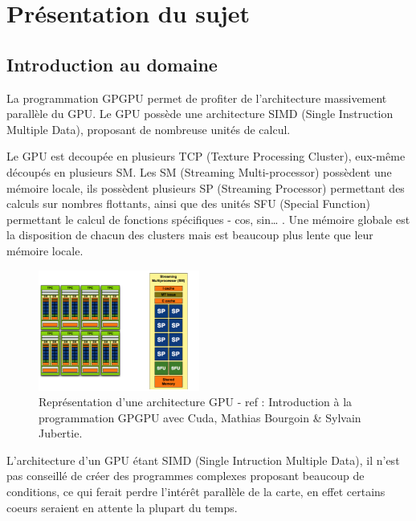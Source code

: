 \documentclass{report}
\begin{document}
\chapter{Présentation du sujet}

\section{Introduction au domaine}
La programmation GPGPU permet de profiter de l’architecture massivement parallèle du GPU. Le GPU possède une architecture SIMD (Single Instruction Multiple Data), proposant de nombreuse unités de calcul.\newline

Le GPU est decoupée en plusieurs TCP (Texture Processing Cluster), eux-même découpés en plusieurs SM. Les SM (Streaming Multi-processor) possèdent une mémoire locale, ils possèdent plusieurs SP (Streaming Processor) permettant des calculs sur nombres flottants, ainsi que des unités SFU (Special Function) permettant le calcul de fonctions spécifiques - cos, sin… . Une mémoire globale est la disposition de chacun des clusters mais est beaucoup plus lente que leur mémoire locale.\newline

\begin{figure}
\begin{center}
\includegraphics[height=150]{image2.png}
\end{center}
\caption{Représentation d’une architecture GPU - ref : Introduction à la programmation GPGPU avec Cuda, Mathias Bourgoin & Sylvain Jubertie.}
\label{test}
\end{figure}

L’architecture d’un GPU étant SIMD (Single Intruction Multiple Data), il n’est pas conseillé de créer des programmes complexes proposant beaucoup de conditions, ce qui ferait perdre l'intérêt parallèle de la carte, en effet certains coeurs seraient en attente la plupart du temps. 
\end{document}
